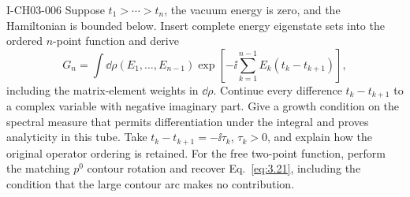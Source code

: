\begin{exercise}{I-CH03-006}
Suppose $t_1>\cdots>t_n$, the vacuum energy is zero, and the Hamiltonian is
bounded below.  Insert complete energy eigenstate sets into the ordered
$n$-point function and derive
\[
 G_n=\int\dd\rho(E_1,\ldots,E_{n-1})
 \exp\!\left[-\ii\sum_{k=1}^{n-1}E_k(t_k-t_{k+1})\right],
\]
including the matrix-element weights in $\dd\rho$.  Continue every
difference $t_k-t_{k+1}$ to a complex variable with negative imaginary part.
Give a growth condition on the spectral measure that permits differentiation
under the integral and proves analyticity in this tube.  Take
$t_k-t_{k+1}=-\ii\tau_k$, $\tau_k>0$, and explain how the original operator
ordering is retained.  For the free two-point function, perform the matching
$p^0$ contour rotation and recover Eq.~\eqref{eq:3.21}, including the condition
that the large contour arc makes no contribution.
\end{exercise}

